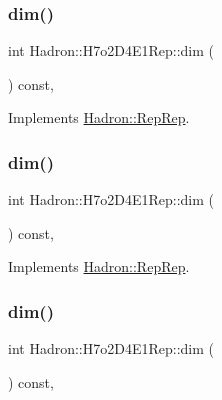 \subsubsection{\texorpdfstring{dim()}{dim()}\hspace{0.1cm}{\footnotesize\ttfamily [3/5]}}
{\footnotesize\ttfamily int Hadron\+::\+H7o2\+D4\+E1\+Rep\+::dim (\begin{DoxyParamCaption}{ }\end{DoxyParamCaption}) const\hspace{0.3cm}{\ttfamily [inline]}, {\ttfamily [virtual]}}



Implements \mbox{\hyperlink{structHadron_1_1RepRep_a92c8802e5ed7afd7da43ccfd5b7cd92b}{Hadron\+::\+Rep\+Rep}}.

\mbox{\label{structHadron_1_1H7o2D4E1Rep_a2c85ff036a1f57d041cf390a824a9f37}} 
\subsubsection{\texorpdfstring{dim()}{dim()}\hspace{0.1cm}{\footnotesize\ttfamily [4/5]}}
{\footnotesize\ttfamily int Hadron\+::\+H7o2\+D4\+E1\+Rep\+::dim (\begin{DoxyParamCaption}{ }\end{DoxyParamCaption}) const\hspace{0.3cm}{\ttfamily [inline]}, {\ttfamily [virtual]}}



Implements \mbox{\hyperlink{structHadron_1_1RepRep_a92c8802e5ed7afd7da43ccfd5b7cd92b}{Hadron\+::\+Rep\+Rep}}.

\mbox{\label{structHadron_1_1H7o2D4E1Rep_a2c85ff036a1f57d041cf390a824a9f37}} 
\subsubsection{\texorpdfstring{dim()}{dim()}\hspace{0.1cm}{\footnotesize\ttfamily [5/5]}}
{\footnotesize\ttfamily int Hadron\+::\+H7o2\+D4\+E1\+Rep\+::dim (\begin{DoxyParamCaption}{ }\end{DoxyParamCaption}) const\hspace{0.3cm}{\ttfamily [inline]}, {\ttfamily [virtual]}}



